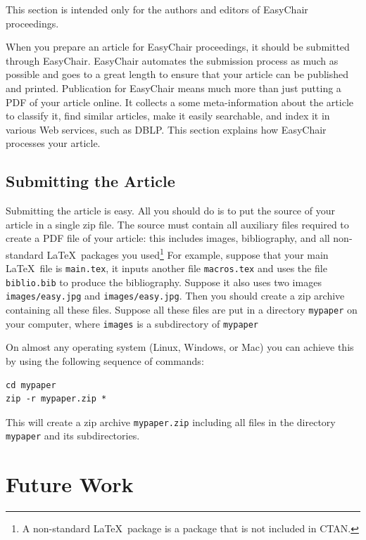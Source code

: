 \documentclass{imav2013}
\begin{document}
This section is intended only for the authors and editors of EasyChair
proceedings. 

When you prepare an article for EasyChair proceedings, it should be
submitted through EasyChair. EasyChair automates the submission
process as much as possible and goes to a great length to ensure that
your article can be published and printed. Publication for EasyChair
means much more than just putting a PDF of your article online. It
collects a some meta-information about the article to classify it,
find similar articles, make it easily searchable, and index it in
various Web services, such as DBLP. This section explains how
EasyChair processes your article. 

\subsection{Submitting the Article}

Submitting the article is easy. All you should do is to put the source
of your article in a single zip file. The source must contain all
auxiliary files required to create a PDF file of your article: this
includes images, bibliography, and all non-standard \LaTeX\ packages
you used\footnote{ 
  A non-standard \LaTeX\ package is a package that is not included in
  CTAN. 
} For example, suppose that your main \LaTeX\ file is
\texttt{main.tex}, it inputs another file \texttt{macros.tex} and uses
the file \texttt{biblio.bib} to produce the bibliography. Suppose it
also uses two images \texttt{images/easy.jpg} and
\texttt{images/easy.jpg}. Then you should create a zip archive
containing all these files. Suppose all these files are put in a
directory \texttt{mypaper} on your computer, where \texttt{images} is
a subdirectory of \texttt{mypaper}

On almost any operating system (Linux,
Windows, or Mac) you can achieve this by using the following sequence
of commands:

\begin{verbatim}
cd mypaper
zip -r mypaper.zip *
\end{verbatim}
This will create a zip archive \texttt{mypaper.zip} including all
files in the directory \texttt{mypaper} and its subdirectories. 




\section{Future Work}
\label{sect:future-work}
\end{document}
